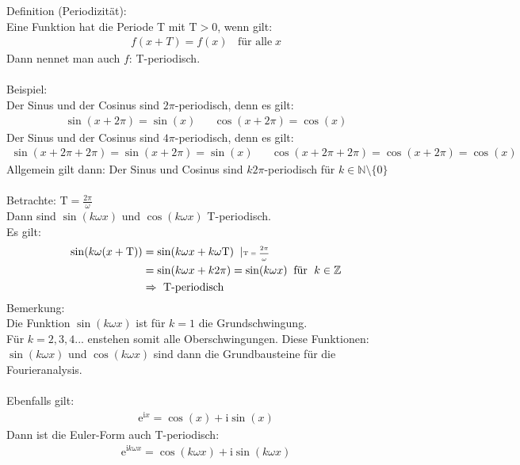 Definition (Periodizität):\\
Eine Funktion hat die Periode T mit $ \mathrm{T}>0 $, wenn gilt:\\
\begin{align*}
f(x+T)=f(x)\;\;\text{ für alle}\; x
\end{align*}
Dann nennet man auch $ f $: T-periodisch.
\\
\\
Beispiel:\\
Der Sinus und der Cosinus sind $2\pi$-periodisch, denn es gilt:\\
\begin{align*}
\sin(x+2\pi)=\sin(x)&&\cos(x+2\pi)=\cos(x)
\end{align*}
Der Sinus und der Cosinus sind $4\pi$-periodisch, denn es gilt:\\
\begin{align*}
\sin(x+2\pi+2\pi)=\sin(x+2\pi)=\sin(x)&&\cos(x+2\pi+2\pi)=\cos(x+2\pi)=\cos(x)
\end{align*}
Allgemein gilt dann: Der Sinus und Cosinus sind $ k2\pi $-periodisch für $ k\in\mathbb{N}\setminus \{0\} $\\
\\
Betrachte: $ \mathrm{T}=\frac{2\pi}{\omega} $\\
Dann sind $ \sin(k\omega x) $ und $\cos( k\omega x) $ T-periodisch.\\
Es gilt:\\
\begin{align*}
\sin(k\omega(x+\mathrm{T}))&=\sin (k\omega x+k\omega \mathrm{T})\;\;\arrowvert\text{\tiny $\mathrm{T}=\frac{2\pi}{\omega} $ }\\
&=\sin (k\omega x+k2\pi)=\sin (k\omega x) \;\;\text{für }\;k\in \mathbb{Z}\\
&\Rightarrow \text{ T-periodisch}
\end{align*}
Bemerkung:\\
Die Funktion $ \sin(k\omega x) $ ist für $ k=1 $ die Grundschwingung.\\
Für $ k=2,3,4... $ enstehen somit alle Oberschwingungen. Diese Funktionen: $ \sin(k\omega x)$ und $ \cos(k\omega x)  $ sind dann die Grundbausteine für die Fourieranalysis.\\
\\
Ebenfalls gilt:\\
\begin{align*}
\mathrm{e}^{\mathrm{i}x}=\cos (x)+\mathrm{i}\sin (x)
\end{align*}
Dann ist die Euler-Form auch T-periodisch:\\
\begin{align*}
\mathrm{e}^{\mathrm{i}k\omega x}= \cos(k\omega x)+\mathrm{i}\sin(k\omega x)
\end{align*}
\newpage
\noindent
